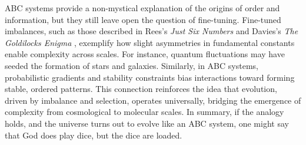 \documentclass[entropy,article,submit,pdftex,moreauthors]{Definitions/mdpi}
\begin{document}
ABC systems provide a non-mystical explanation of the origins of order and information, but they still leave open the question of fine-tuning. Fine-tuned imbalances, such as those described in Rees's \textit{Just Six Numbers} \cite{rees2000just} and Davies's \textit{The Goldilocks Enigma} \cite{davies2006goldilocks}, exemplify how slight asymmetries in fundamental constants enable complexity across scales. For instance, quantum fluctuations may have seeded the formation of stars and galaxies. Similarly, in ABC systems, probabilistic gradients and stability constraints bias interactions toward forming stable, ordered patterns. This connection reinforces the idea that evolution, driven by imbalance and selection, operates universally, bridging the emergence of complexity from cosmological to molecular scales. In summary, if the analogy holds, and the universe turns out to evolve like an ABC system, one might say that God does play dice, but the dice are loaded.



\vspace{6pt} 



\end{document}
